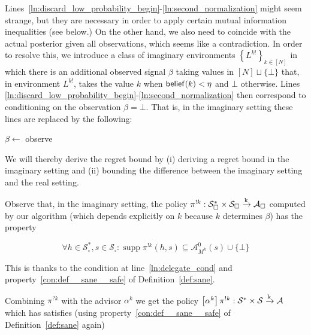 \documentclass[anon,12pt]{colt2018} %
\DeclareMathOperator{\Supp}{supp}
\newcommand{\AP}[1]{\left(#1\right)}
\newcommand{\AB}[1]{\left[#1\right]}
\newcommand{\AC}[1]{\left\{#1\right\}}
\newcommand{\K}{\xrightarrow{\textnormal{k}}}
\newcommand{\A}{\mathcal{A}}
\newcommand{\St}{\mathcal{S}}
\newcommand{\AdP}[2]{\AB{#1}#2}
\newcommand{\Ad}{\alpha}
\newcommand{\Rev}{\beta}
\newcommand{\IP}{\pi^{!k}}
\begin{document}
Lines~\ref{ln:discard_low_probability_begin}-\ref{ln:second_normalization} might seem strange, but they are necessary in order to apply certain mutual information inequalities (see below.) On the other hand, we also need \Z to coincide with the actual posterior given all observations, which seems like a contradiction. In order to resolve this, we introduce a class of imaginary environments $\AC{L^{k!}}_{k\in[N]}$ in which there is an additional observed signal $\Rev$ taking values in $[N]\sqcup\{\bot\}$ that, in environment $L^{k!}$, takes the value $k$ when $\DataSty{belief}(k) < \eta$ and $\bot$ otherwise. Lines \ref{ln:discard_low_probability_begin}-\ref{ln:second_normalization} then correspond to conditioning \Z on the observation $\beta=\bot$. That is, in the imaginary setting these lines are replaced by the following:

\begin{algorithm}[h]

\setcounter{AlgoLine}{32}

$\beta\leftarrow$ observe

\eIf{$\beta = \bot$}{
        \For{$k=0$ \KwTo $N-1$}{
                \If{$\Z(k) < \eta$}{
                        $\Z(k) \leftarrow 0$\label{ln:beta__discard}
                }
        }
        \Z$\leftarrow\AP{\sum_{k=0}^{N-1}\Z(k)}^{-1}\cdot\Z$\;
}{
        \Z$ \leftarrow \boldsymbol{0}$\;
        $\Z(\beta) \leftarrow 1$\;
}

\end{algorithm}

We will thereby derive the regret bound by (i) deriving a regret bound in the imaginary setting and (ii) bounding the difference between the imaginary setting and the real setting.

Observe that, in the imaginary setting, the policy $\IP: \St_\square^* \times \St_\square \K \A_\square$ computed by our algorithm (which depends explicitly on $k$ because $k$ determines $\beta$) has the property

\begin{equation}
\forall h\in\St_\square^*,s\in\St_\square: \Supp{\IP(h,s)} \subseteq \A_{M^k}^0(s)\cup\{\bot\}
\end{equation}

This is thanks to the condition at line~\ref{ln:delegate_cond} and property~\ref{con:def__sane__safe} of Definition~\ref{def:sane}.

Combining $\pi^{?k}$ with the advisor $\alpha^k$ we get the policy $\AdP{\Ad^k}{\IP}: \St^*\times\St\K\A$ which has satisfies (using property~\ref{con:def__sane__safe} of Definition~\ref{def:sane} again)
\end{document}
